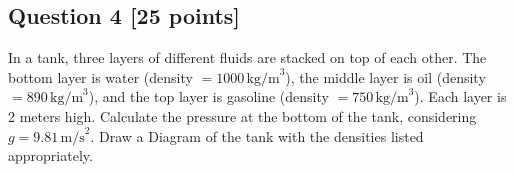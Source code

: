 \documentclass[12pt]{article}
\begin{document}
\subsection*{Question 4 [25 points]}
In a tank, three layers of different fluids are stacked on top of each other. The bottom layer is water (density \( = 1000 \, \text{kg/m}^3 \)), the middle layer is oil (density \( = 890 \, \text{kg/m}^3 \)), and the top layer is gasoline (density \( = 750 \, \text{kg/m}^3 \)). Each layer is 2 meters high. Calculate the pressure at the bottom of the tank, considering \( g = 9.81 \, \text{m/s}^2 \). Draw a Diagram of the tank with the densities listed appropriately.
\end{document}
